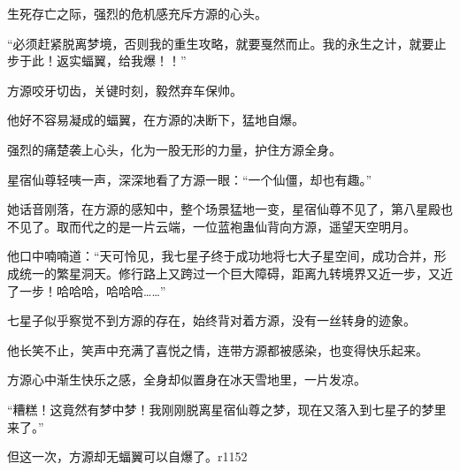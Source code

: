 \begin{this_body}
生死存亡之际，强烈的危机感充斥方源的心头。

“必须赶紧脱离梦境，否则我的重生攻略，就要戛然而止。我的永生之计，就要止步于此！返实蝠翼，给我爆！！”

方源咬牙切齿，关键时刻，毅然弃车保帅。

他好不容易凝成的蝠翼，在方源的决断下，猛地自爆。

强烈的痛楚袭上心头，化为一股无形的力量，护住方源全身。

星宿仙尊轻咦一声，深深地看了方源一眼：“一个仙僵，却也有趣。”

她话音刚落，在方源的感知中，整个场景猛地一变，星宿仙尊不见了，第八星殿也不见了。取而代之的是一片云端，一位蓝袍蛊仙背向方源，遥望天空明月。

他口中喃喃道：“天可怜见，我七星子终于成功地将七大子星空间，成功合并，形成统一的繁星洞天。修行路上又跨过一个巨大障碍，距离九转境界又近一步，又近了一步！哈哈哈，哈哈哈……”

七星子似乎察觉不到方源的存在，始终背对着方源，没有一丝转身的迹象。

他长笑不止，笑声中充满了喜悦之情，连带方源都被感染，也变得快乐起来。

方源心中渐生快乐之感，全身却似置身在冰天雪地里，一片发凉。

“糟糕！这竟然有梦中梦！我刚刚脱离星宿仙尊之梦，现在又落入到七星子的梦里来了。”

但这一次，方源却无蝠翼可以自爆了。r1152

\end{this_body}


